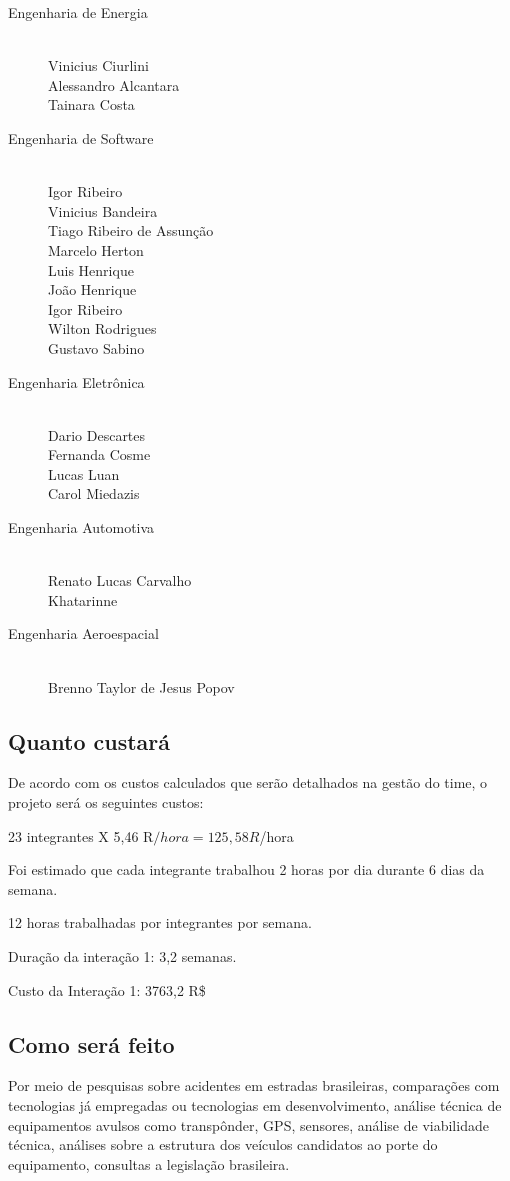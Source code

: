 \begin{description}
  \item[Engenharia de Energia] \hfill
  \\Vinicius Ciurlini
  \\Alessandro Alcantara
  \\Tainara Costa
  \item[Engenharia de Software] \hfill
  \\Igor Ribeiro
  \\Vinicius Bandeira
  \\Tiago Ribeiro de Assunção
  \\Marcelo Herton
  \\Luis Henrique
  \\João Henrique
  \\Igor Ribeiro
  \\Wilton Rodrigues
  \\Gustavo Sabino
  \item[Engenharia Eletrônica] \hfill
  \\Dario Descartes
  \\Fernanda Cosme
  \\Lucas Luan
  \\Carol Miedazis
  \item[Engenharia Automotiva] \hfill
  \\Renato Lucas Carvalho
  \\Khatarinne
  \item[Engenharia Aeroespacial] \hfill
  \\Brenno Taylor de Jesus Popov
\end{description}

\subsection{Quanto custará}
\label{sub:Quanto custará}
De acordo com os custos calculados que serão detalhados na gestão do time, o projeto será os seguintes custos:


23 integrantes X 5,46 R$/hora = 125,58 R$/hora


  Foi estimado que cada integrante trabalhou 2 horas por dia durante 6 dias da semana.

12 horas trabalhadas por integrantes por semana.

Duração da interação 1: 3,2 semanas.

Custo da Interação 1: 3763,2 R\$



\subsection{Como será feito}
Por meio de pesquisas sobre acidentes em estradas brasileiras, comparações com tecnologias já empregadas ou tecnologias em desenvolvimento,  análise técnica de equipamentos avulsos como transpônder, GPS,  sensores, análise de viabilidade técnica, análises sobre a estrutura dos veículos candidatos ao porte do equipamento, consultas a legislação brasileira.
